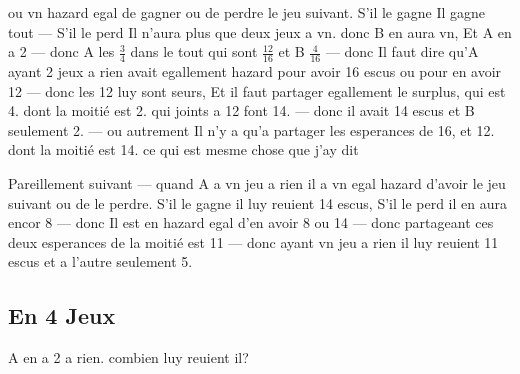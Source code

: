 \documentclass[11pt,a4paper]{article}
\begin{document}

ou vn hazard egal de gagner ou de perdre le jeu suivant. S'il le gagne Il gagne tout — S'il le perd Il n'aura plus que deux jeux a vn. donc B en aura vn, Et A en a 2 — donc A   les $\frac{3}{4}$ dans le tout qui sont $\frac{12}{16}$ et B $\frac{4}{16}$ — donc Il faut dire qu'A ayant 2 jeux a \struck{\ill{}} rien avait egallement hazard pour avoir 16 escus ou pour en avoir 12 — donc les 12 luy sont seurs, Et il faut partager egallement le surplus, qui est 4. dont la moitié est 2. qui joints a 12 font 14. — donc il avait 14 escus et B seulement 2. — ou autrement Il n'y a qu'a partager les esperances de 16, et 12. dont la moitié est 14. ce qui est  mesme chose que j'ay dit

Pareillement suivant  — quand A a vn jeu a rien il a vn egal hazard d'avoir le jeu suivant ou de le perdre. S'il le gagne il luy reuient 14 escus, S'il le perd il en aura encor  8 — donc \struck{\ill{}} Il est en hazard egal d'en avoir \struck{\ill{}} 8 ou 14 — donc partageant ces deux esperances de  la moitié est 11 \struck{\ill{}} — donc ayant vn jeu a rien il luy reuient 11 escus et a l'autre seulement 5.

\subsection*{En 4 Jeux}

A en a 2 a rien. combien luy reuient il?
\end{document}
